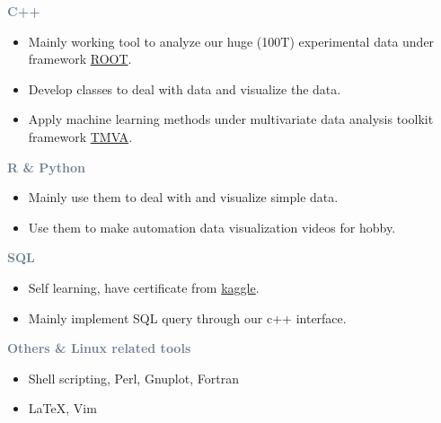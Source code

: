 
\textcolor{SlateGrey}{\textbf{C++}}
\newline

\begin{itemize}
    \item Mainly working tool to analyze our huge (100T) experimental data under framework \href{https://root.cern/}{ROOT}.
    \item Develop classes to deal with data and visualize the data.
    \item Apply machine learning methods under multivariate data analysis toolkit framework \href{https://root.cern/manual/tmva/}{TMVA}.
\end{itemize}

\textcolor{SlateGrey}{\textbf{R \& Python}}
\newline

\begin{itemize}
    \item Mainly use them to deal with and visualize simple data.
    \item Use them to make automation data visualization videos for hobby. 
\end{itemize}

\textcolor{SlateGrey}{\textbf{SQL}}
\newline

\begin{itemize}
    \item Self learning, have certificate from \href{https://www.kaggle.com/learn/overview}{kaggle}.
    \item Mainly implement SQL query through our c++ interface.
\end{itemize}

\textcolor{SlateGrey}{\textbf{Others \& Linux related tools}}
\newline

\begin{itemize}
    \item Shell scripting, Perl, Gnuplot, Fortran 
    \item \LaTeX, Vim
\end{itemize}



